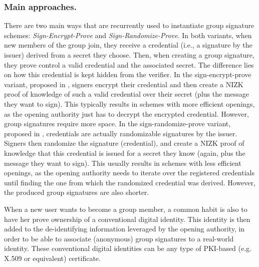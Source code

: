 \subsubsection{Main approaches.}
%
There are two main ways that are recurrently used to instantiate group signature
schemes: \emph{Sign-Encrypt-Prove} and \emph{Sign-Randomize-Prove}. In both
variants, when new members of the group join, they receive a credential (i.e.,
a signature by the issuer) derived from a secret they choose. Then, when
creating a group signature, they prove control a valid credential and the
associated secret. The difference lies on how this credential is kept hidden
from the verifier.
%
In the sign-encrypt-prove variant, proposed in \cite{bmw03}, signers
encrypt their credential and then
create a NIZK \needcite proof of knowledge of such a valid credential
over their secret (plus the message they want to sign). This typically results
in schemes with more efficient openings, as the opening authority just has
to decrypt the encrypted credential. However, group signatures require more
space.
%
In the sign-randomize-prove variant, proposed in \needcite {},
credentials are actually randomizable signatures by the issuer. Signers then
randomize the signature (credential), and create a NIZK proof of knowledge that
this credential is issued for a secret they know (again, plus the message
they want to sign). This usually results in schemes with less efficient openings,
as the opening authority needs to iterate over the registered credentials until
finding the one from which the randomized credential was derived. However, the
produced group signatures are also shorter.

When a new user wants to become a group member, a common habit is also to have
her prove ownership of a conventional digital identity. This identity is then
added to the de-identifying information leveraged by the opening authority, in
order to be able to associate (anonymous) group signatures to a real-world
identity. These conventional digital identities can be any type of PKI-based
(e.g. X.509 or equivalent) certificate. 

